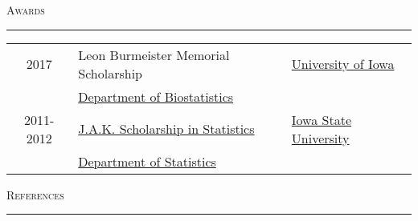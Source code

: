 \documentclass[a4paper]{article}
\newcommand{\deptbiostat}{\href{https://www.public-health.uiowa.edu/biostat/}{Department of Biostatistics}}
\newcommand{\uiowa}{\href{https://www.uiowa.edu}{University of Iowa}}
\newcommand{\isu}{\href{https://www.iastate.edu/}{Iowa State University}}
\newcommand{\deptstat}{\href{https://stat.iastate.edu/}{Department of Statistics}}
\newcommand{\jakscholar}{\href{https://www.stat.iastate.edu/undergraduate-scholarship-and-awards}{J.A.K. Scholarship in Statistics}}
\begin{document}
\begin{flushleft}
  \Large\textsc{Awards}
  \textcolor{usafagrey}{\rule[0.5\baselineskip]{\textwidth}{0.75pt}}
\end{flushleft}
\vspace{-\baselineskip}

\begin{tabular*}{0.9\textwidth}{@{\extracolsep{\fill}}cll}
  2017 & Leon Burmeister Memorial Scholarship & \uiowa \\ 
       & \deptbiostat & \\[3pt]
  2011-2012 & \jakscholar & \isu \\
            & \deptstat
\end{tabular*}
\vspace{0.25\baselineskip}

\begin{flushleft}
  \Large\textsc{References}
  \textcolor{usafagrey}{\rule[0.5\baselineskip]{\textwidth}{0.75pt}}
\end{flushleft}

\end{document}
